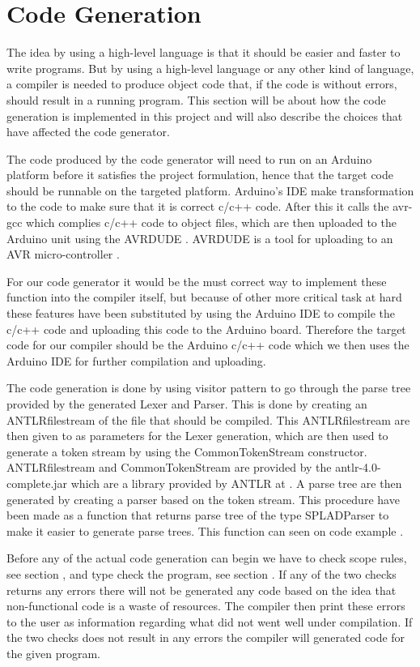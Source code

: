 \section{Code Generation}
The idea by using a high-level language is that it should be easier and faster to write programs. But by using a high-level language or any other kind of language, a compiler is needed to produce object code that, if the code is without errors, should result in a running program. This section will be about how the code generation is implemented in this project and will also describe the choices that have affected the code generator.

The code produced by the code generator will need to run on an Arduino platform before it satisfies the project formulation, hence that the target code should be runnable on the targeted platform. Arduino's IDE make transformation to the code to make sure that it is correct c/c++ code. After this it calls the avr-gcc which complies c/c++ code to object files, which are then uploaded to the Arduino unit using the AVRDUDE . AVRDUDE is a tool for uploading to an AVR micro-controller .

For our code generator it would be the must correct way to implement these function into the compiler itself, but because of other more critical task at hard these features have been substituted by using the Arduino IDE to compile the c/c++ code and uploading this code to the Arduino board. Therefore the target code for our compiler should be the Arduino c/c++ code which we then uses the Arduino IDE for further compilation and uploading.

The code generation is done by using visitor pattern to go through the parse tree provided by the generated Lexer and Parser. This is done by creating an ANTLRfilestream of the file that should be compiled. This ANTLRfilestream are then given to as parameters for the Lexer generation, which are then used to generate a token stream by using the CommonTokenStream constructor. ANTLRfilestream and CommonTokenStream are provided by the antlr-4.0-complete.jar which are a library provided by ANTLR at . A parse tree are then generated by creating a parser based on the token stream. This procedure have been made as a function that returns parse tree of the type SPLADParser to make it easier to generate parse trees. This function can seen on code example .

Before any of the actual code generation can begin we have to check scope rules, see section , and type check the program, see section . If any of the two checks returns any errors there will not be generated any code based on the idea that non-functional code is a waste of resources. The compiler then print these errors to the user as information regarding what did not went well under compilation. If the two checks does not result in any errors the compiler will generated code for the given program.